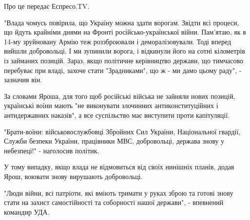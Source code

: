 \documentclass[a4paper,11pt]{extreport}
\begin{document}
Про це передає Еспресо.TV.

"Влада чомусь повірила, що Україну можна здати ворогам. Звідти всі процеси, що
йдуть крайніми днями на Фронті російсько-української війни. Пам’ятаю, як в
14-му зруйновану Армію теж роззброювали і деморалізовували. Тоді вперед вийшли
добровольці. І ми зупинили ворога, і відкинули його на сотні кілометрів із
займаних позицій. Зараз, якщо політичне керівництво держави, що тимчасово
перебуває при владі, захоче стати "Зрадниками", що ж - ми дамо цьому раду", -
зазначив він.

За словами Яроша, для того щоб російські війська не зайняли нових позицій,
українські воїни мають "не виконувати злочинних антиконституційних і
антидержавних наказів", а все суспільство має виступити проти капітуляції.

"Брати-воїни: військовослужбовці Збройних Сил України, Національної гвардії,
Служби безпеки України, працівники МВС, добровольці, держава знову у
небезпеці!" - наголосив політик.

У тому випадку, якщо влада не відмовиться від своїх нинішніх планів, додав
Ярош, воювати знову вирушають добровольці.

"Люди війни, всі патріоти, які вміють тримати у руках зброю та готові знову
стати на захист самостійності та соборності нашої держави", - впевнений
командир УДА.
\end{document}
